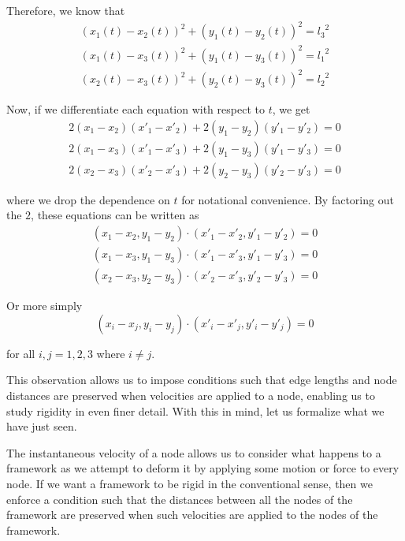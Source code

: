 \begin{flushleft}
Therefore, we know that 
\[
\begin{split}
(x_1(t) - x_2(t))^2 + (y_1(t) - y_2(t))^2 = {l_3}^2 \\
(x_1(t) - x_3(t))^2 + (y_1(t) - y_3(t))^2 = {l_1}^2 \\
(x_2(t) - x_3(t))^2 + (y_2(t) - y_3(t))^2 = {l_2}^2
\end{split}
\]

Now, if we differentiate each equation with respect to $t$, we get 
\[
\begin{split}
2(x_1 - x_2)(x'_1 - x'_2) + 2(y_1 - y_2)(y'_1 - y'_2) = 0 \\
2(x_1 - x_3)(x'_1 - x'_3) + 2(y_1 - y_3)(y'_1 - y'_3) = 0 \\
2(x_2 - x_3)(x'_2 - x'_3) + 2(y_2 - y_3)(y'_2 - y'_3) = 0
\end{split}
\]

where we drop the dependence on $t$ for notational convenience. By factoring out the $2$, these equations can be written as
\[
\begin{split}
(x_1 - x_2, y_1 - y_2) \cdot (x'_1 - x'_2, y'_1 - y'_2) = 0 \\
(x_1 - x_3, y_1 - y_3) \cdot (x'_1 - x'_3, y'_1 - y'_3) = 0 \\
(x_2 - x_3, y_2 - y_3) \cdot (x'_2 - x'_3, y'_2 - y'_3) = 0
\end{split}
\]

Or more simply
\[
(x_i - x_j, y_i - y_j) \cdot (x'_i - x'_j, y'_i - y'_j) = 0
\]

for all $i,j = 1,2,3$ where $i \neq j$.
\end{flushleft}

\begin{flushleft}
This observation allows us to impose conditions such that edge lengths and node distances are preserved when velocities are applied to a node, enabling us to study rigidity in even finer detail. With this in mind, let us formalize what we have just seen.
\end{flushleft}

\begin{flushleft}
The instantaneous velocity of a node allows us to consider what happens to a framework as we attempt to deform it by applying some motion or force to every node. If we want a framework to be rigid in the conventional sense, then we enforce a condition such that the distances between all the nodes of the framework are preserved when such velocities are applied to the nodes of the framework. 
\end{flushleft}

